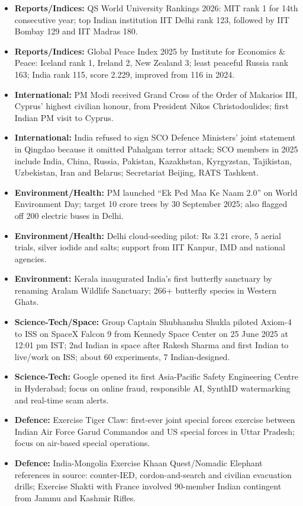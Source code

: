 \documentclass[10pt,a4paper]{article}
\begin{document}
\begin{itemize}
    \item \textbf{Reports/Indices:} QS World University Rankings 2026: MIT rank 1 for 14th consecutive year; top Indian institution IIT Delhi rank 123, followed by IIT Bombay 129 and IIT Madras 180.
    \item \textbf{Reports/Indices:} Global Peace Index 2025 by Institute for Economics \& Peace: Iceland rank 1, Ireland 2, New Zealand 3; least peaceful Russia rank 163; India rank 115, score 2.229, improved from 116 in 2024.
    \item \textbf{International:} PM Modi received Grand Cross of the Order of Makarios III, Cyprus' highest civilian honour, from President Nikos Christodoulides; first Indian PM visit to Cyprus.
    \item \textbf{International:} India refused to sign SCO Defence Ministers' joint statement in Qingdao because it omitted Pahalgam terror attack; SCO members in 2025 include India, China, Russia, Pakistan, Kazakhstan, Kyrgyzstan, Tajikistan, Uzbekistan, Iran and Belarus; Secretariat Beijing, RATS Tashkent.
    \item \textbf{Environment/Health:} PM launched ``Ek Ped Maa Ke Naam 2.0'' on World Environment Day; target 10 crore trees by 30 September 2025; also flagged off 200 electric buses in Delhi.
    \item \textbf{Environment/Health:} Delhi cloud-seeding pilot: Rs 3.21 crore, 5 aerial trials, silver iodide and salts; support from IIT Kanpur, IMD and national agencies.
    \item \textbf{Environment:} Kerala inaugurated India's first butterfly sanctuary by renaming Aralam Wildlife Sanctuary; 266+ butterfly species in Western Ghats.
    \item \textbf{Science-Tech/Space:} Group Captain Shubhanshu Shukla piloted Axiom-4 to ISS on SpaceX Falcon 9 from Kennedy Space Center on 25 June 2025 at 12:01 pm IST; 2nd Indian in space after Rakesh Sharma and first Indian to live/work on ISS; about 60 experiments, 7 Indian-designed.
    \item \textbf{Science-Tech:} Google opened its first Asia-Pacific Safety Engineering Centre in Hyderabad; focus on online fraud, responsible AI, SynthID watermarking and real-time scam alerts.
    \item \textbf{Defence:} Exercise Tiger Claw: first-ever joint special forces exercise between Indian Air Force Garud Commandos and US special forces in Uttar Pradesh; focus on air-based special operations.
    \item \textbf{Defence:} India-Mongolia Exercise Khaan Quest/Nomadic Elephant references in source: counter-IED, cordon-and-search and civilian evacuation drills; Exercise Shakti with France involved 90-member Indian contingent from Jammu and Kashmir Rifles.

\end{itemize}
\end{document}
